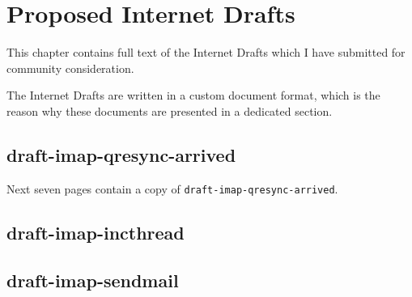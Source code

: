 \documentclass[trojita]{subfiles}
\begin{document}
\chapter{Proposed Internet Drafts}
\label{sec:id-manuscripts}

This chapter contains full text of the Internet Drafts which I have submitted for community consideration.

The Internet Drafts are written in a custom document format, which is the reason why these documents are presented in a
dedicated section.

\section{draft-imap-qresync-arrived}

Next seven pages contain a copy of {\tt draft-imap-qresync-arrived}.



\section{draft-imap-incthread}


\section{draft-imap-sendmail}

\end{document}
